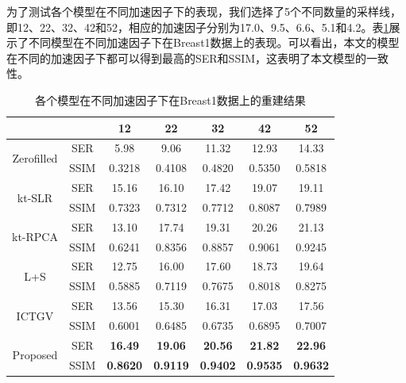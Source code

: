为了测试各个模型在不同加速因子下的表现，我们选择了5个不同数量的采样线，即12、22、32、42和52，相应的加速因子分别为17.0、9.5、6.6、5.1和4.2。表\ref{tab:sampling}展示了不同模型在不同加速因子下在Breast1数据上的表现。可以看出，本文的模型在不同的加速因子下都可以得到最高的SER和SSIM，这表明了本文模型的一致性。
\begin{table}
	\centering
	\caption{各个模型在不同加速因子下在Breast1数据上的重建结果}
	\begin{tabular}{|c|c|c|c|c|c|c|}
		\hline
		\hline
		\multicolumn{2}{|c|}{\diagbox{模型}{采样线}} & 12 & 22 & 32 & 42 & 52\\	
		\hline
		\multirow{2}{*}{Zerofilled}
		&SER & 5.98 & 9.06 & 11.32 & 12.93 & 14.33 \\
		\cline{2-7}&SSIM & 0.3218 & 0.4108 & 0.4820 & 0.5350 & 0.5818 \\
		\hline
		\multirow{2}{*}{kt-SLR}
		&SER & 15.16 & 16.10 & 17.42 & 19.07 & 19.11 \\
		\cline{2-7}&SSIM & 0.7323 & 0.7312 & 0.7712 & 0.8087 & 0.7989 \\
		\hline
		\multirow{2}{*}{kt-RPCA}
		&SER & 13.10 & 17.74 & 19.31 & 20.26 & 21.13 \\
		\cline{2-7}&SSIM & 0.6241 & 0.8356 & 0.8857 & 0.9061 & 0.9245 \\
		\hline
		\multirow{2}{*}{L+S}
		&SER & 12.75 & 16.00 & 17.60 & 18.73 & 19.64 \\
		\cline{2-7}&SSIM & 0.5885 & 0.7119 & 0.7675 & 0.8018 & 0.8275 \\
		\hline
		\multirow{2}{*}{ICTGV}
		&SER & 13.56 & 15.30 & 16.31 & 17.03 & 17.56 \\
		\cline{2-7}&SSIM & 0.6001 & 0.6485 & 0.6735 & 0.6895 & 0.7007\\
		\hline
		\multirow{2}{*}{Proposed}
		&SER & \textbf{16.49} & \textbf{19.06} & \textbf{20.56} & \textbf{21.82} & \textbf{22.96}\\
		\cline{2-7}&SSIM & \textbf{0.8620} & \textbf{0.9119} & \textbf{0.9402} & \textbf{0.9535} & \textbf{0.9632}\\
		\hline
	\end{tabular}
	\label{tab:sampling}
\end{table}


